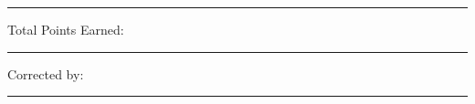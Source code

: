 \documentclass[letterpaper, 12pt]{article}
\begin{document}
\vspace{2in}
\hrule
\vspace{0.5in}
Total Points Earned: \rule{1in}{0.01in}

\vspace{1in}
Corrected by: \rule{3in}{0.01in}



 
\end{document}
